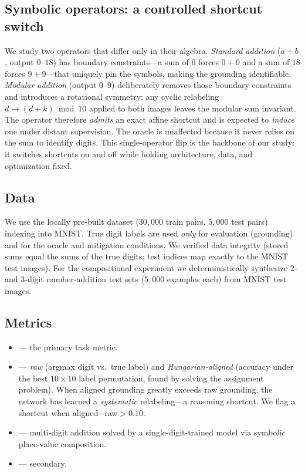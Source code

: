 \subsection{Symbolic operators: a controlled shortcut switch}
We study two operators that differ only in their algebra.
\emph{Standard addition} ($a{+}b$, output $0$--$18$) has boundary constraints---a sum of $0$ forces
$0{+}0$ and a sum of $18$ forces $9{+}9$---that uniquely pin the symbols, making the grounding
identifiable. \emph{Modular addition} \modten (output $0$--$9$) deliberately removes those boundary
constraints and introduces a rotational symmetry: any cyclic relabeling $d\mapsto(d{+}k)\bmod 10$
applied to both images leaves the modular sum invariant. The operator therefore \emph{admits} an exact
affine shortcut and is expected to \emph{induce} one under distant supervision. The oracle is unaffected
because it never relies on the sum to identify digits. This single-operator flip is the backbone of our
study: it switches shortcuts on and off while holding architecture, data, and optimization fixed.

\subsection{Data}
We use the locally pre-built \mnistadd dataset ($30{,}000$ train pairs, $5{,}000$ test pairs) indexing
into MNIST. True digit labels are used \emph{only} for evaluation (grounding) and for the oracle and
mitigation conditions. We verified data integrity (stored sums equal the sums of the true digits; test
indices map exactly to the MNIST test images). For the compositional experiment we deterministically
synthesize $2$- and $3$-digit number-addition test sets ($5{,}000$ examples each) from MNIST test
images.

\subsection{Metrics}
\begin{itemize}[leftmargin=*,itemsep=0pt,topsep=0pt]
    \item {} --- the primary task metric.
    \item {} --- \emph{raw} (argmax digit vs.\ true label) and
    \emph{Hungarian-aligned} (accuracy under the best $10{\times}10$ label permutation, found by solving
    the assignment problem). When aligned grounding greatly exceeds raw grounding, the network has
    learned a \emph{systematic} relabeling---a reasoning shortcut. We flag a shortcut when
    aligned${-}$raw${>}0.10$.
    \item {} --- multi-digit addition solved by a single-digit-trained
    model via symbolic place-value composition.
    \item {} --- secondary.
\end{itemize}

